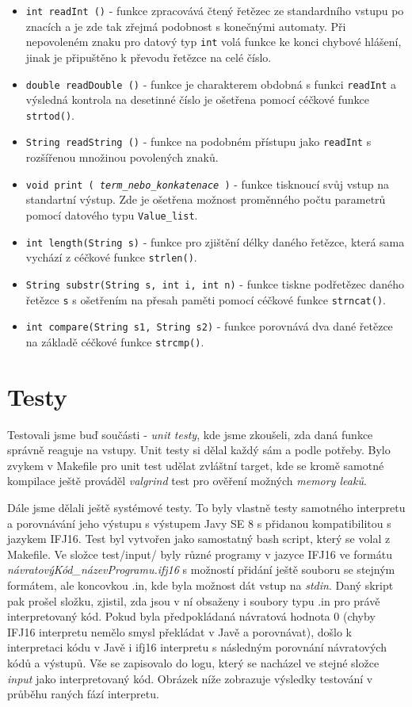 \documentclass[a4paper,11pt]{article}
\begin{document}
\begin{itemize}
\item {\texttt{int readInt ()}} - funkce zpracovává čtený řetězec ze standardního vstupu po znacích a je zde tak zřejmá podobnost s konečnými automaty. Při nepovoleném znaku pro datový typ \texttt{int} volá funkce ke konci chybové hlášení, jinak je připuštěno k převodu řetězce na celé číslo.
\item {\texttt{double readDouble ()}} - funkce je charakterem obdobná s funkci \texttt{readInt} a výsledná kontrola na desetinné číslo je ošetřena pomocí céčkové funkce \texttt{strtod()}.
\item {\texttt{String readString ()}} - funkce na podobném přístupu jako \texttt{readInt} s rozšířenou množinou povolených znaků.
\item {\texttt{void print ( \emph{term\_nebo\_konkatenace} )}} - funkce tisknoucí svůj vstup na standartní výstup. Zde je ošetřena možnost proměnného počtu parametrů pomocí datového typu \texttt{Value\_list}. 
\item {\texttt{int length(String s)}} - funkce pro zjištění délky daného řetězce, která sama vychází z céčkové funkce \texttt{strlen()}.
\item {\texttt{String substr(String s, int i, int n)}} - funkce tiskne podřetězec daného řetězce \texttt{s} s ošetřením na přesah paměti pomocí céčkové funkce \texttt{strncat()}.
\item {\texttt{int compare(String s1, String s2)}} - funkce porovnává dva dané řetězce na základě céčkové funkce \texttt{strcmp()}.
\end{itemize}

\section{Testy}
Testovali jsme buď součásti - \textit{unit testy}, kde jsme zkoušeli, zda daná funkce správně reaguje na vstupy. Unit testy si dělal každý sám a podle potřeby. Bylo zvykem v Makefile pro unit test udělat zvláštní target, kde se kromě samotné kompilace ještě prováděl \textit{valgrind} test pro ověření možných \textit{memory leaků}. 

Dále jsme dělali ještě systémové testy. To byly vlastně testy samotného interpretu a porovnávání jeho výstupu s výstupem Javy SE 8 s přidanou kompatibilitou s jazykem IFJ16. Test byl vytvořen jako samostatný bash script, který se volal z Makefile. Ve složce test/input/ byly různé programy v jazyce IFJ16 ve formátu \textit{návratovýKód\_názevProgramu.ifj16} s možností přidání ještě souboru se stejným formátem, ale koncovkou .in, kde byla možnost dát vstup na \textit{stdin}. Daný skript pak prošel složku, zjistil, zda jsou v ní obsaženy i soubory typu .in pro právě interpretovaný kód. Pokud byla předpokládaná návratová hodnota 0 (chyby IFJ16 interpretu nemělo smysl překládat v Javě a porovnávat), došlo k interpretaci kódu v Javě i ifj16 interpretu s následným porovnání návratových kódů a výstupů. Vše se zapisovalo do logu, který se nacházel ve stejné složce \textit{input} jako interpretovaný kód. Obrázek níže zobrazuje výsledky testování v průběhu raných fází interpretu.\\
\end{document}
